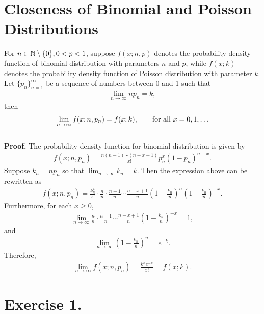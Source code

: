 \section*{Closeness of Binomial and Poisson Distributions}

For $n\in \mathbb{N}\setminus\{0\}, 0 < p < 1$, suppose $f(x; n, p)$ denotes the probability density function of binomial distribution with parameters $n$ and $p$, while $f(x; k)$ denotes the probability density function of Poisson distribution with parameter $k$. Let $\{p_n\}_{n=1}^{\infty}$ be a sequence of numbers between 0 and 1 such that
\begin{align*}
\lim_{n\rightarrow\infty} np_n = k,
\end{align*}
then
\begin{align*}
\lim_{n\rightarrow \infty} f(x; n, p_n) = f(x; k), \qquad \mathrm{for\ all\ } x = 0, 1, \ldots
\end{align*}
~\\
\textbf{Proof.} The probability density function for binomial distribution is given by
\begin{align*}
f(x; n, p_n) = \frac{n(n-1)\cdots (n-x+1)}{x!}p_n^x (1-p_n)^{n-x}.
\end{align*}
Suppose $k_n = np_n$ so that $\lim_{n\rightarrow \infty} k_n = k$. Then the expression above can be rewritten as 
\begin{align*}
f(x; n, p_n) = \frac{k_n^x}{x!}\cdot \frac{n}{n}\cdot \frac{n-1}{n}\cdots \frac{n-x+1}{n}\left(1 - \frac{k_n}{n} \right)^n \left(1 - \frac{k_n}{n} \right)^{-x}.
\end{align*}
Furthermore, for each $x\geq 0$,
\begin{align*}
\lim_{n\rightarrow \infty} \frac{n}{n} \cdot \frac{n-1}{n}\cdots \frac{n-x+1}{n}\left(1 - \frac{k_n}{n} \right)^{-x} = 1,
\end{align*}
and
\begin{align*}
\lim_{n\rightarrow \infty} \left(1 - \frac{k_n}{n} \right)^n = e^{-k}.
\end{align*}
Therefore,
\begin{align*}
\lim_{n\rightarrow \infty} f(x; n, p_n) = \frac{k^xe^{-k}}{x!} = f(x; k).
\end{align*}

\section*{Exercise 1.}

